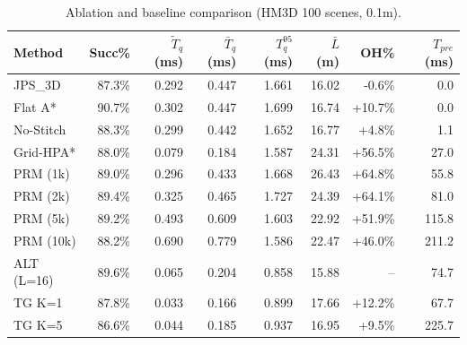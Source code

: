 \begin{table}[t]
\centering
\caption{Ablation and baseline comparison (HM3D 100 scenes, 0.1m).}
\label{tab:ablation}
\begin{tabular}{l rrrr rrr}
\toprule
Method & Succ\% & $\tilde{T}_q$ (ms) & $\bar{T}_q$ (ms) & $T_q^{95}$ (ms) & $\bar{L}$ (m) & OH\% & $T_{pre}$ (ms) \\
\midrule
  JPS_3D & 87.3\% & 0.292 & 0.447 & 1.661 & 16.02 & -0.6\% & 0.0 \\
  Flat A* & 90.7\% & 0.302 & 0.447 & 1.699 & 16.74 & +10.7\% & 0.0 \\
  No-Stitch & 88.3\% & 0.299 & 0.442 & 1.652 & 16.77 & +4.8\% & 1.1 \\
  Grid-HPA* & 88.0\% & 0.079 & 0.184 & 1.587 & 24.31 & +56.5\% & 27.0 \\
  PRM (1k) & 89.0\% & 0.296 & 0.433 & 1.668 & 26.43 & +64.8\% & 55.8 \\
  PRM (2k) & 89.4\% & 0.325 & 0.465 & 1.727 & 24.39 & +64.1\% & 81.0 \\
  PRM (5k) & 89.2\% & 0.493 & 0.609 & 1.603 & 22.92 & +51.9\% & 115.8 \\
  PRM (10k) & 88.2\% & 0.690 & 0.779 & 1.586 & 22.47 & +46.0\% & 211.2 \\
  ALT (L=16) & 89.6\% & 0.065 & 0.204 & 0.858 & 15.88 & -- & 74.7 \\
  TG K=1 & 87.8\% & 0.033 & 0.166 & 0.899 & 17.66 & +12.2\% & 67.7 \\
  TG K=5 & 86.6\% & 0.044 & 0.185 & 0.937 & 16.95 & +9.5\% & 225.7 \\
\bottomrule
\end{tabular}
\end{table}